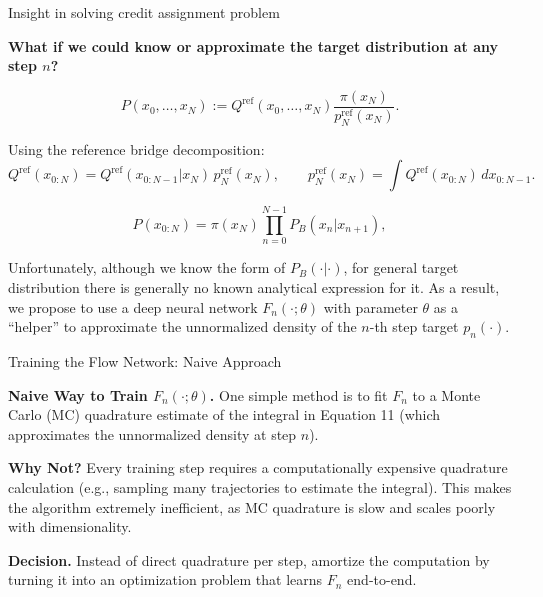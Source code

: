 \documentclass[aspectratio=169,xcolor=dvipsnames]{beamer}
\begin{document}
\begin{frame}[t]{Insight in solving credit assignment problem}
\footnotesize

\textbf{What if we could know or approximate the target distribution at any step $n$?}

\[
P(x_0, \dots, x_N) := Q^{\text{ref}}(x_0, \dots, x_N) \frac{\pi(x_N)}{p^{\text{ref}}_N(x_N)}.
\]

Using the reference bridge decomposition:
\[
Q^{\text{ref}}(x_{0:N}) = Q^{\text{ref}}(x_{0:N-1} | x_N) \, p_N^{\text{ref}}(x_N),
\qquad p_N^{\text{ref}}(x_N) = \int Q^{\text{ref}}(x_{0:N}) \, dx_{0:N-1}.
\]

\[
P(x_{0:N}) = \pi(x_N) \prod_{n=0}^{N-1} P_B(x_n | x_{n+1}),
\]

Unfortunately, although we know the form of $P_B(\cdot|\cdot)$, for general target distribution there is generally no known analytical expression for it. As a result, we propose to use a deep neural network $F_n(\cdot; \theta)$ with parameter $\theta$ as a “helper” to approximate the unnormalized density of the $n$-th step target $p_n(\cdot)$.
\end{frame}

\begin{frame}[t]{Training the Flow Network: Naive Approach}
\footnotesize

\textbf{Naive Way to Train $F_n(\cdot; \theta)$.} One simple method is to fit $F_n$ to a Monte Carlo (MC) quadrature estimate of the integral in Equation 11 (which approximates the unnormalized density at step $n$).

\textbf{Why Not?} Every training step requires a computationally expensive quadrature calculation (e.g., sampling many trajectories to estimate the integral). This makes the algorithm extremely inefficient, as MC quadrature is slow and scales poorly with dimensionality.

\textbf{Decision.} Instead of direct quadrature per step, amortize the computation by turning it into an optimization problem that learns $F_n$ end-to-end.

\end{frame}
\end{document}
